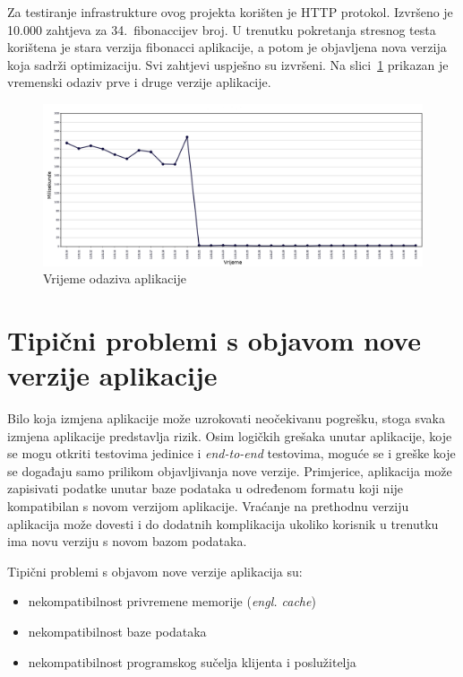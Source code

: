 Za testiranje infrastrukture ovog projekta korišten je HTTP protokol. Izvršeno je 10.000 zahtjeva
za 34.~fibonaccijev broj. U trenutku pokretanja stresnog testa korištena je stara verzija fibonacci
aplikacije, a potom je objavljena nova verzija koja sadrži optimizaciju. Svi zahtjevi uspješno su
izvršeni. Na slici~\ref{fig:04stresstest} prikazan je vremenski odaziv prve i druge verzije
aplikacije.

\begin{figure}[h]
    \centering
    \includegraphics[width=\textwidth]{img/04/response_time.png}
    \caption{Vrijeme odaziva aplikacije}%
    \label{fig:04stresstest}
\end{figure}

\section{Tipični problemi s objavom nove verzije aplikacije}
Bilo koja izmjena aplikacije može uzrokovati neočekivanu pogrešku, stoga svaka izmjena aplikacije
predstavlja rizik. Osim logičkih grešaka unutar aplikacije, koje se mogu otkriti testovima jedinice
i \textit{end-to-end} testovima, moguće se i greške koje se događaju samo prilikom objavljivanja
nove verzije. Primjerice, aplikacija može zapisivati podatke unutar baze podataka u određenom
formatu koji nije kompatibilan s novom verzijom aplikacije. Vraćanje na prethodnu verziju aplikacija
može dovesti i do dodatnih komplikacija ukoliko korisnik u trenutku ima novu verziju s novom bazom
podataka.

Tipični problemi s objavom nove verzije aplikacija su:
\begin{itemize}
    \item nekompatibilnost privremene memorije (\textit{engl. cache})
    \item nekompatibilnost baze podataka
    \item nekompatibilnost programskog sučelja klijenta i poslužitelja
\end{itemize}

